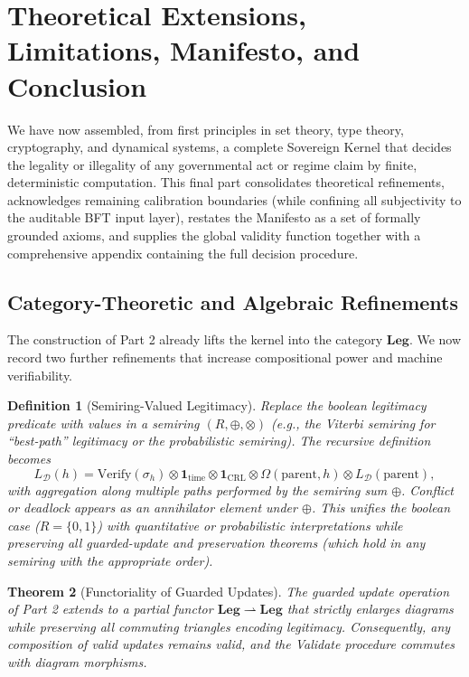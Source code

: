 \documentclass[11pt,a4paper]{article}
\newtheorem{theorem}{Theorem}[section]
\newtheorem{definition}[theorem]{Definition}
\begin{document}
\section{Theoretical Extensions, Limitations, Manifesto, and Conclusion}

We have now assembled, from first principles in set theory, type theory, cryptography, and dynamical systems, a complete Sovereign Kernel that decides the legality or illegality of any governmental act or regime claim by finite, deterministic computation. This final part consolidates theoretical refinements, acknowledges remaining calibration boundaries (while confining all subjectivity to the auditable BFT input layer), restates the Manifesto as a set of formally grounded axioms, and supplies the global validity function together with a comprehensive appendix containing the full decision procedure.

\subsection{Category-Theoretic and Algebraic Refinements}

The construction of Part 2 already lifts the kernel into the category \(\mathbf{Leg}\). We now record two further refinements that increase compositional power and machine verifiability.

\begin{definition}[Semiring-Valued Legitimacy]
Replace the boolean legitimacy predicate with values in a semiring \((R, \oplus, \otimes)\) (e.g., the Viterbi semiring for “best-path” legitimacy or the probabilistic semiring). The recursive definition becomes
\[
L_{\mathcal{D}}(h) = \text{Verify}(\sigma_h) \otimes \mathbf{1}_{\text{time}} \otimes \mathbf{1}_{\text{CRL}} \otimes \Omega(\text{parent}, h) \otimes L_{\mathcal{D}}(\text{parent}),
\]
with aggregation along multiple paths performed by the semiring sum \(\oplus\). Conflict or deadlock appears as an annihilator element under \(\oplus\). This unifies the boolean case (\(R = \{0,1\}\)) with quantitative or probabilistic interpretations while preserving all guarded-update and preservation theorems (which hold in any semiring with the appropriate order).
\end{definition}

\begin{theorem}[Functoriality of Guarded Updates]
The guarded update operation of Part 2 extends to a partial functor \(\mathbf{Leg} \rightharpoonup \mathbf{Leg}\) that strictly enlarges diagrams while preserving all commuting triangles encoding legitimacy. Consequently, any composition of valid updates remains valid, and the Validate procedure commutes with diagram morphisms.
\end{theorem}
\end{document}
